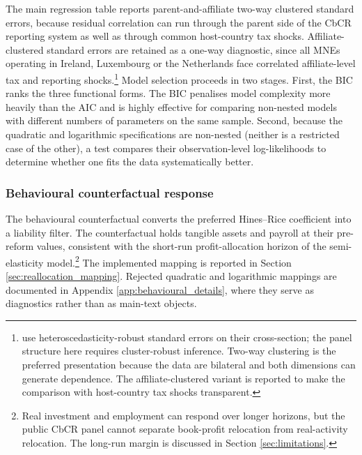 \documentclass[11pt,a4paper]{article}
\begin{document}
The main regression table reports parent-and-affiliate two-way clustered standard errors, because residual correlation can run through the parent side of the CbCR reporting system as well as through common host-country tax shocks. Affiliate-clustered standard errors are retained as a one-way diagnostic, since all MNEs operating in Ireland, Luxembourg or the Netherlands face correlated affiliate-level tax and reporting shocks.\footnote{\citet{garcia-bernardo2024} use heteroscedasticity-robust standard errors on their cross-section; the panel structure here requires cluster-robust inference. Two-way clustering is the preferred presentation because the data are bilateral and both dimensions can generate dependence. The affiliate-clustered variant is reported to make the comparison with host-country tax shocks transparent.} Model selection proceeds in two stages. First, the BIC ranks the three functional forms. The BIC penalises model complexity more heavily than the AIC and is highly effective for comparing non-nested models with different numbers of parameters on the same sample. Second, because the quadratic and logarithmic specifications are non-nested (neither is a restricted case of the other), a \citet{vuong1989} test compares their observation-level log-likelihoods to determine whether one fits the data systematically better.

\subsubsection{Behavioural counterfactual response}\label{sec:counterfactual}

The behavioural counterfactual converts the preferred Hines--Rice coefficient into a liability filter. The counterfactual holds tangible assets and payroll at their pre-reform values, consistent with the short-run profit-allocation horizon of the semi-elasticity model.\footnote{Real investment and employment can respond over longer horizons, but the public CbCR panel cannot separate book-profit relocation from real-activity relocation. The long-run margin is discussed in Section \ref{sec:limitations}.} The implemented mapping is reported in Section \ref{sec:reallocation_mapping}. Rejected quadratic and logarithmic mappings are documented in Appendix \ref{app:behavioural_details}, where they serve as diagnostics rather than as main-text objects.
\end{document}
